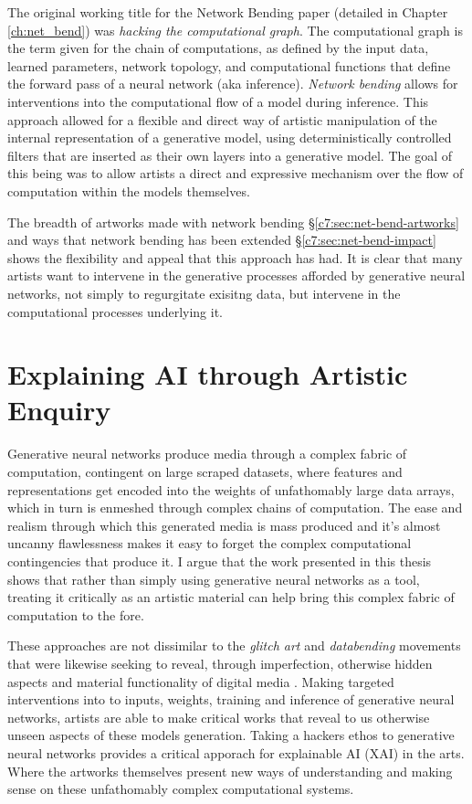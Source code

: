 The original working title for the Network Bending paper (detailed in Chapter \ref{ch:net_bend}) was \textit{hacking the computational graph}.
The computational graph is the term given for the chain of computations, as defined by the input data, learned parameters, network topology, and computational functions that define the forward pass of a neural network (aka inference). \textit{Network bending} allows for interventions into the computational flow of a model during inference. 
This approach allowed for a flexible and direct way of artistic manipulation of the internal representation of a generative model, using deterministically controlled filters that are inserted as their own layers into a generative model.
The goal of this being was to allow artists a direct and expressive mechanism over the flow of computation within the models themselves.

The breadth of artworks made with network bending \S \ref{c7:sec:net-bend-artworks} and ways that network bending has been extended \S \ref{c7:sec:net-bend-impact} shows the flexibility and appeal that this approach has had.
It is clear that many artists want to intervene in the generative processes afforded by generative neural networks, not simply to regurgitate exisitng data, but intervene in the computational processes underlying it.

\section{Explaining AI through Artistic Enquiry}
\label{c8:sec:explaining}

Generative neural networks produce media through a complex fabric of computation, contingent on large scraped datasets, where features and representations get encoded into the weights of unfathomably large data arrays, which in turn is enmeshed through complex chains of computation. 
The ease and realism through which this generated media is mass produced and it's almost uncanny flawlessness \cite{smith2023ai} makes it easy to forget the complex computational contingencies that produce it. 
I argue that the work presented in this thesis shows that rather than simply using generative neural networks as a tool, treating it critically as an artistic material can help bring this complex fabric of computation to the fore. 

These approaches are not dissimilar to the \textit{glitch art} and \textit{databending} movements that were likewise seeking to reveal, through imperfection, otherwise hidden aspects and material functionality of digital media \cite{kemper2023glitch}.
Making targeted interventions into to inputs, weights, training and inference of generative neural networks, artists are able to make critical works that reveal to us otherwise unseen aspects of these models generation. 
Taking a hackers ethos to generative neural networks provides a critical apporach for explainable AI (XAI) in the arts.
Where the artworks themselves present new ways of understanding and making sense on these unfathomably complex computational systems. 

